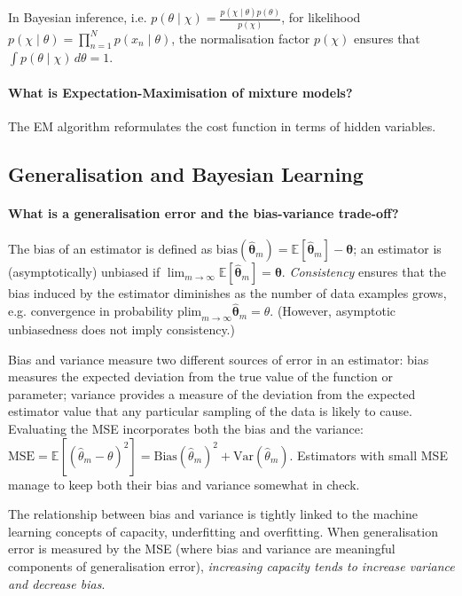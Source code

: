 In Bayesian inference, i.e. $p(\theta \mid \chi) = \frac{p(\chi \mid \theta) p(\theta)}{p(\chi)}$,
for likelihood $p(\chi \mid \theta) = \prod_{n=1}^N{p(x_n \mid \theta)}$,
the normalisation factor $p(\chi)$ ensures that $\int{p(\theta \mid \chi) \, d\theta} = 1$.

\paragraph{What is Expectation-Maximisation of mixture models?}

The EM algorithm reformulates the cost function in terms of hidden variables.


\newpage
\subsection{Generalisation and Bayesian Learning}

\paragraph{What is a generalisation error and the bias-variance trade-off?}

The bias of an estimator is defined as $\text{bias}(\hat{\bm{\theta}}_m) = \mathbb{E}[\hat{\bm{\theta}}_m] - \bm{\theta}$; an estimator is (asymptotically) unbiased if $\lim_{m \rightarrow \infty}{\mathbb{E}[\hat{\bm{\theta}}_m]} = \bm{\theta}$.
\textit{Consistency} ensures that the bias induced by the estimator diminishes as the number of data examples grows, e.g. convergence in probability $\text{plim}_{m \rightarrow \infty}{\hat{\bm{\theta}}_m} = \theta$.
(However, asymptotic unbiasedness does not imply consistency.)

Bias and variance measure two different sources of error in an estimator:
bias measures the expected deviation from the true value of the function or parameter;
variance provides a measure of the deviation from the expected estimator value that any particular sampling of the data is likely to cause.
Evaluating the MSE incorporates both the bias and the variance: $\text{MSE} = \mathbb{E}[(\hat{\theta}_m - \theta)^2] = \text{Bias}(\hat{\theta}_m)^2 + \text{Var}(\hat{\theta}_m)$.
Estimators with small MSE manage to keep both their bias and variance somewhat in check.

The relationship between bias and variance is tightly linked to the machine learning concepts of capacity, underfitting and overfitting.
When generalisation error is measured by the MSE (where bias and variance are meaningful components of generalisation error),
\textit{increasing capacity tends to increase variance and decrease bias}.

